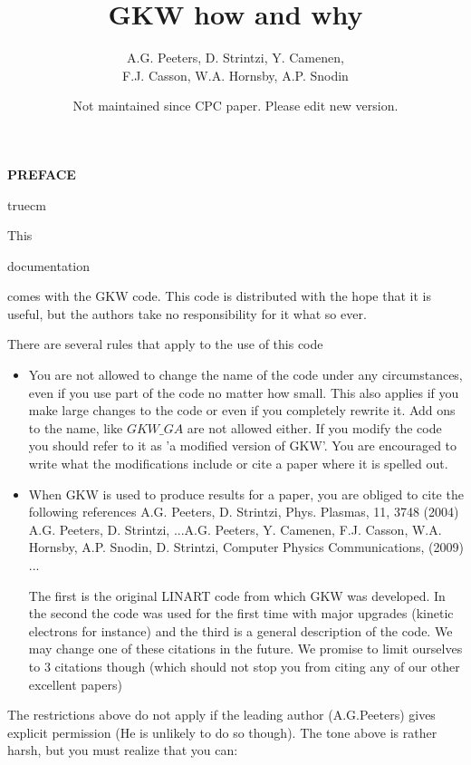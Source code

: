 \documentclass{report}
\title{GKW how and why}
\author{A.G. Peeters, D. Strintzi, Y. Camenen,\\
F.J. Casson, W.A. Hornsby, A.P. Snodin}
\date{Not maintained since CPC paper.  Please edit new version.}%
\def\black{\special     {ps: 0 0 0 setrgbcolor}}
\def\blue{\special      {ps: 0 0 1 setrgbcolor}}
\begin{document}
\def\compset#1{\vskip 0.2 truecm \noindent {\texttt #1 \hfill} \vskip0.2 truecm \noindent}

\maketitle
\cleardoublepage 
\centerline{\bf PREFACE} 
 truecm 

This \blue documentation \black comes with the GKW code. This code is distributed with the hope that 
it is useful, but the authors take no responsibility for it what so ever. 

There are several rules that apply to the use of this code 
\begin{itemize} 

\item You are not allowed to change the name of the code under any circumstances, even 
if you use part of the code no matter how small. This also applies if you make large 
changes to the code or even if you completely rewrite it. Add ons to the name, like 
$GKW\_GA$ are not allowed either. If you modify the code you should refer to it as 
'a modified version of GKW'. You are encouraged to write what the modifications include 
or cite a paper where it is spelled out. 

\item When GKW is used to produce results for a paper, you are obliged to cite the 
following references \hfill \break 
[1] A.G. Peeters, D. Strintzi, Phys. Plasmas, 11, 3748 (2004) \hfill \break
[2] A.G. Peeters, D. Strintzi, ...\hfill \break %
[3] A.G. Peeters, Y. Camenen, F.J. Casson, W.A. Hornsby, A.P. Snodin, D. Strintzi, Computer Physics Communications, (2009) ...\hfill \break

The first is the original LINART code from which GKW was developed. In the second 
the code was used for the first time with major upgrades (kinetic electrons for instance) 
and the third is a general description of the code. We may change one of these citations
in the future. We promise to limit ourselves to 3 citations though (which should not stop 
you from citing any of our other excellent papers)  

\end{itemize} 

\noindent 
The restrictions above do not apply if the leading author (A.G.Peeters) gives explicit 
permission (He is unlikely to do so though).
The tone above is rather harsh, but you must realize that you can: 
\end{document}
